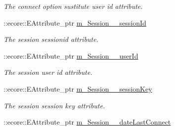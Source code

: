 \begin{DoxyCompactItemize}
\begin{DoxyCompactList}\small\item\em The connect option sustitute user id attribute. \item\end{DoxyCompactList}\item 
\hypertarget{classUMS__Data_1_1UMS__DataPackage_a0473c0704c5c459f1b78755a141b198b}{
::ecore::EAttribute\_\-ptr \hyperlink{classUMS__Data_1_1UMS__DataPackage_a0473c0704c5c459f1b78755a141b198b}{m\_\-Session\_\-\_\-sessionId}}
\label{classUMS__Data_1_1UMS__DataPackage_a0473c0704c5c459f1b78755a141b198b}

\begin{DoxyCompactList}\small\item\em The session sessionid attribute. \item\end{DoxyCompactList}\item 
\hypertarget{classUMS__Data_1_1UMS__DataPackage_adab9a58e38640b484d0df5949fd6cb11}{
::ecore::EAttribute\_\-ptr \hyperlink{classUMS__Data_1_1UMS__DataPackage_adab9a58e38640b484d0df5949fd6cb11}{m\_\-Session\_\-\_\-userId}}
\label{classUMS__Data_1_1UMS__DataPackage_adab9a58e38640b484d0df5949fd6cb11}

\begin{DoxyCompactList}\small\item\em The session user id attribute. \item\end{DoxyCompactList}\item 
\hypertarget{classUMS__Data_1_1UMS__DataPackage_a41ff052c11327c88bfa812b0be8b65d8}{
::ecore::EAttribute\_\-ptr \hyperlink{classUMS__Data_1_1UMS__DataPackage_a41ff052c11327c88bfa812b0be8b65d8}{m\_\-Session\_\-\_\-sessionKey}}
\label{classUMS__Data_1_1UMS__DataPackage_a41ff052c11327c88bfa812b0be8b65d8}

\begin{DoxyCompactList}\small\item\em The session session key attribute. \item\end{DoxyCompactList}\item 
\hypertarget{classUMS__Data_1_1UMS__DataPackage_afd678e167a42fb76b9d816e6622f15fd}{
::ecore::EAttribute\_\-ptr \hyperlink{classUMS__Data_1_1UMS__DataPackage_afd678e167a42fb76b9d816e6622f15fd}{m\_\-Session\_\-\_\-dateLastConnect}}
\label{classUMS__Data_1_1UMS__DataPackage_afd678e167a42fb76b9d816e6622f15fd}


\end{DoxyCompactItemize}
